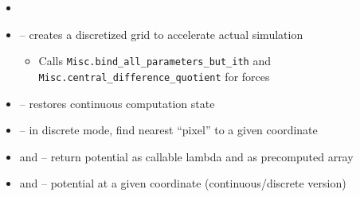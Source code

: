 
\begin{frame}[fragile]
%
\begin{defbox}
\begin{itemize}
\item {}
\item {} -- creates a discretized grid to accelerate actual simulation
	\begin{itemize}
	\item Calls \texttt{Misc.bind\_all\_parameters\_but\_ith} and \texttt{Misc.central\_difference\_quotient} for forces
	\end{itemize}
\item {} -- restores continuous computation state
\item {} -- in discrete mode, find nearest \enquote{pixel} to a given coordinate
\item {} and  -- return potential as callable lambda and as precomputed array
\item {} and  -- potential at a given coordinate (continuous/discrete version)
\end{itemize}
\end{defbox}
%
\end{frame}


